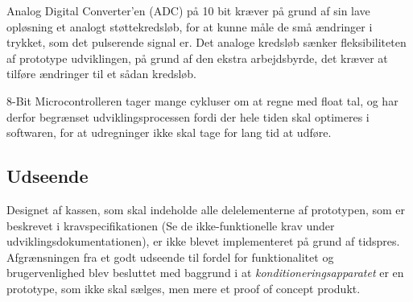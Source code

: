 Analog Digital Converter'en (ADC) på 10 bit kræver på grund af sin lave opløsning et analogt støttekredsløb, for at kunne måle de små ændringer i trykket, som det pulserende signal er. Det analoge kredsløb sænker fleksibiliteten af prototype udviklingen, på grund af den ekstra arbejdsbyrde, det kræver at tilføre ændringer til et sådan kredsløb.

8-Bit Microcontrolleren tager mange cykluser om at regne med float tal, og har derfor begrænset udviklingsprocessen fordi der hele tiden skal optimeres i softwaren, for at udregninger ikke skal tage for lang tid at udføre.


\subsection{Udseende}
Designet af kassen, som skal indeholde alle delelementerne af prototypen, som er beskrevet i kravspecifikationen (Se de ikke-funktionelle krav under udviklingsdokumentationen), er ikke blevet implementeret på grund af tidspres. Afgrænsningen fra et godt udseende til fordel for funktionalitet og brugervenlighed blev besluttet med baggrund i at \textit{konditioneringsapparatet} er en prototype, som ikke skal sælges, men mere et proof of concept produkt. 

